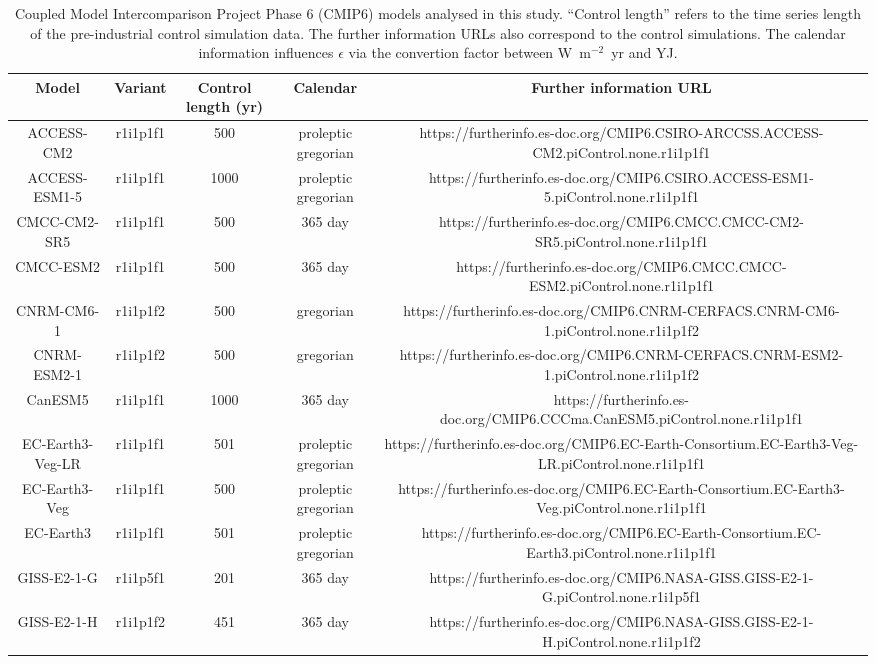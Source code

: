 \begin{table*}[t]
\centering
\caption{Coupled Model Intercomparison Project Phase 6 (CMIP6) models analysed in this study. ``Control length'' refers to the time series length of the pre-industrial control simulation data. The further information URLs also correspond to the control simulations. The calendar information influences $\epsilon$ via the convertion factor between W~m$^{-2}$~yr and YJ.}
\begin{tabular}{ccccc}
\toprule
Model & Variant & Control length (yr) & Calendar & Further information URL \\
\midrule
ACCESS-CM2 & r1i1p1f1 & 500 & proleptic gregorian & https://furtherinfo.es-doc.org/CMIP6.CSIRO-ARCCSS.ACCESS-CM2.piControl.none.r1i1p1f1 \\
ACCESS-ESM1-5 & r1i1p1f1 & 1000 & proleptic gregorian & https://furtherinfo.es-doc.org/CMIP6.CSIRO.ACCESS-ESM1-5.piControl.none.r1i1p1f1 \\
CMCC-CM2-SR5 & r1i1p1f1 & 500 & 365 day & https://furtherinfo.es-doc.org/CMIP6.CMCC.CMCC-CM2-SR5.piControl.none.r1i1p1f1 \\
CMCC-ESM2 & r1i1p1f1 & 500 & 365 day & https://furtherinfo.es-doc.org/CMIP6.CMCC.CMCC-ESM2.piControl.none.r1i1p1f1 \\
CNRM-CM6-1 & r1i1p1f2 & 500 & gregorian & https://furtherinfo.es-doc.org/CMIP6.CNRM-CERFACS.CNRM-CM6-1.piControl.none.r1i1p1f2 \\
CNRM-ESM2-1 & r1i1p1f2 & 500 & gregorian & https://furtherinfo.es-doc.org/CMIP6.CNRM-CERFACS.CNRM-ESM2-1.piControl.none.r1i1p1f2 \\
CanESM5 & r1i1p1f1 & 1000 & 365 day & https://furtherinfo.es-doc.org/CMIP6.CCCma.CanESM5.piControl.none.r1i1p1f1 \\
EC-Earth3-Veg-LR & r1i1p1f1 & 501 & proleptic gregorian & https://furtherinfo.es-doc.org/CMIP6.EC-Earth-Consortium.EC-Earth3-Veg-LR.piControl.none.r1i1p1f1 \\
EC-Earth3-Veg & r1i1p1f1 & 500 & proleptic gregorian & https://furtherinfo.es-doc.org/CMIP6.EC-Earth-Consortium.EC-Earth3-Veg.piControl.none.r1i1p1f1 \\
EC-Earth3 & r1i1p1f1 & 501 & proleptic gregorian & https://furtherinfo.es-doc.org/CMIP6.EC-Earth-Consortium.EC-Earth3.piControl.none.r1i1p1f1 \\
GISS-E2-1-G & r1i1p5f1 & 201 & 365 day & https://furtherinfo.es-doc.org/CMIP6.NASA-GISS.GISS-E2-1-G.piControl.none.r1i1p5f1 \\
GISS-E2-1-H & r1i1p1f2 & 451 & 365 day & https://furtherinfo.es-doc.org/CMIP6.NASA-GISS.GISS-E2-1-H.piControl.none.r1i1p1f2 \\

\end{tabular}
\end{table*}
